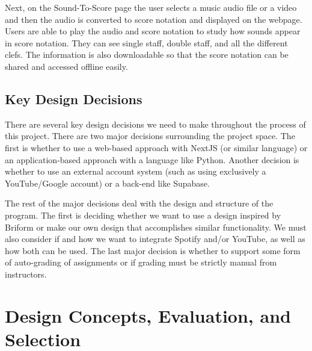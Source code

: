 \documentclass[12pt, letterpaper]{article}
\begin{document}
Next, on the Sound-To-Score page the user selects a music audio file or a video and then the audio is converted to score notation and displayed on the webpage. Users are able to play the audio and score notation to study how sounds appear in score notation. They can see single staff, double staff, and all the different clefs. The information is also downloadable so that the score notation can be shared and accessed offline easily.

\subsection*{Key Design Decisions}
There are several key design decisions we need to make throughout the process of this project. There are two major decisions surrounding the project space. The first is whether to use a web-based approach with NextJS (or similar language) or an application-based approach with a language like Python. Another decision is whether to use an external account system (such as using exclusively a YouTube/Google account) or a back-end like Supabase.

The rest of the major decisions deal with the design and structure of the program. The first is deciding whether we want to use a design inspired by Briform or make our own design that accomplishes similar functionality. We must also consider if and how we want to integrate Spotify and/or YouTube, as well as how both can be used. The last major decision is whether to support some form of auto-grading of assignments or if grading must be strictly manual from instructors.

\section*{Design Concepts, Evaluation, and Selection}
\end{document}
